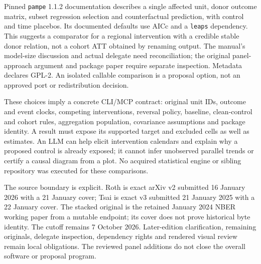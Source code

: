Pinned \texttt{pampe} 1.1.2 documentation describes a single affected unit, donor outcome matrix, subset regression selection
and counterfactual prediction, with control and time placebos. Its documented defaults use AICc and a \texttt{leaps}
dependency. This suggests a comparator for a regional intervention with a credible stable donor relation, not a cohort ATT
obtained by renaming output. The manual's model-size discussion and actual delegate need reconciliation; the original
panel-approach argument and package paper require separate inspection. Metadata declares GPL-2. An isolated callable
comparison is a proposal option, not an approved port or redistribution decision.\citep{exec28_panel_software}

These choices imply a concrete CLI/MCP contract: original unit IDs, outcome and event clocks, competing interventions,
reversal policy, baseline, clean-control and cohort rules, aggregation population, covariance assumptions and package identity.
A result must expose its supported target and excluded cells as well as estimates. An LLM can help elicit intervention
calendars and explain why a proposed control is already exposed; it cannot infer unobserved parallel trends or certify a
causal diagram from a plot. No acquired statistical engine or sibling repository was executed for these comparisons.

The source boundary is explicit. Roth is exact arXiv v2 submitted 16 January 2026 with a 21 January cover; Tsai is exact
v3 submitted 21 January 2025 with a 22 January cover. The stacked original is the retained January 2024 NBER working paper
from a mutable endpoint; its cover does not prove historical byte identity. The cutoff remains 7 October 2026.
Later-edition clarification, remaining originals, delegate inspection, dependency rights and rendered visual review remain
local obligations. The reviewed panel additions do not close the overall software or proposal program.
